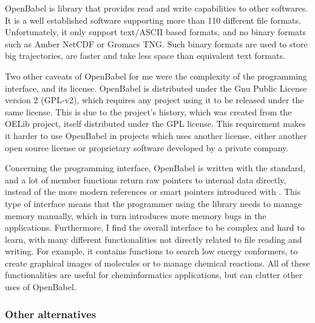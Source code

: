 \documentclass[thesis]{subfiles}
\begin{document}
OpenBabel\cite{OBoyle2011} is \cxx library that provides read and write
capabilities to other softwares. It is a well established software supporting
more than 110 different file formats. Unfortunately, it only support text/ASCII
based formats, and no binary formats such as Amber NetCDF or Gromacs TNG. Such
binary formats are used to store big trajectories, are faster and take less
space than equivalent text formats.

Two other caveats of OpenBabel for me were the complexity of the programming
interface, and its license. OpenBabel is distributed under the Gnu Public
License version 2 (GPL-v2), which requires any project using it to be released
under the same license. This is due to the project's history, which was created
from the OELib project, itself distributed under the GPL license. This
requirement makes it harder to use OpenBabel in projects which uses another
license, either another open source license or proprietary software developed by
a private company.

Concerning the programming interface, OpenBabel is written with the 
standard, and a lot of member functions return raw pointers to internal data
directly, instead of the more modern references or smart pointers introduced
with . This type of interface means that the programmer using the library
needs to manage memory manually, which in turn introduces more memory bugs in
the applications. Furthermore, I find the overall interface to be complex and
hard to learn, with many different functionalities not directly related to file
reading and writing. For example, it contains functions to search low energy
conformers, to create graphical images of molecules or to manage chemical
reactions. All of these functionalities are useful for cheminformatics
applications, but can clutter other uses of OpenBabel.

\subsubsection{Other alternatives}
\end{document}

